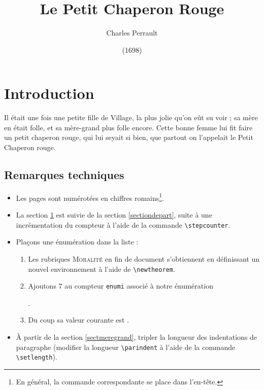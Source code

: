 \documentclass[a4paper,11pt]{article}
\title{Le Petit Chaperon Rouge}
\author{Charles Perrault}
\date{(1698)}
\begin{document}
\maketitle

\tableofcontents

\newpage
\section{Introduction}\label{sectionintro}
Il était une fois une petite fille de Village, la plus jolie qu'on eût su voir ; sa mère en était folle, et sa mère-grand plus folle encore. Cette bonne femme lui fit faire un petit chaperon rouge, qui lui seyait si bien, que partout on l'appelait le Petit Chaperon rouge.

\subsection{Remarques techniques}
\begin{itemize}
\item Les pages sont numérotées en chiffres romains\footnote{En général, la commande correspondante se place dans l'en-tête.}.
\item La section \ref{sectionintro} est suivie de la section \ref{sectiondepart}, suite à une incrémentation du compteur à l'aide de la commande \verb+\stepcounter+.
\item Plaçons une énumération dans la liste :
\begin{enumerate}
	\item Les rubriques \textsc{Moralité} en fin de document s'obtiennent en définissant un nouvel environnement à l'aide de \verb+\newtheorem+.
	\item Ajoutons 7 au compteur \texttt{enumi} associé à notre énumération\addtocounter{enumi}{7}.
	\item Du coup sa valeur courante est \theenumi.
\end{enumerate}
\item À partir de la section \ref{sectmeregrand}, tripler la longueur des indentations de paragraphe (modifier la longueur \verb+\parindent+ à l'aide de la commande \verb+\setlength+).
\end{itemize}

\end{document}
